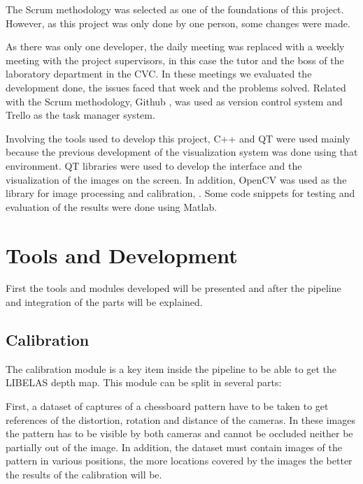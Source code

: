 \documentclass[10pt,a4paper,twocolumn,twoside]{article}
\begin{document}
	The Scrum methodology was selected as one of the foundations of this project. However, as this project was only done by one person, some changes were made. 
	
	As there was only one developer, the daily meeting was replaced with a weekly meeting with the project supervisors, in this case the tutor and the boss of the laboratory department in the CVC. In these meetings we evaluated the development done, the issues faced that week and the problems solved. Related with the Scrum methodology, Github \cite{web:github},\cite{web:githubDesktop} was used as version control system and Trello\cite{web:trello} as the task manager system.
	
	Involving the tools used to develop this project, C++ and QT \cite{web:qt} were used mainly because the previous development of the visualization system was done using that environment. QT libraries were used to develop the interface and the visualization of the images on the screen. In addition, OpenCV was used as the library for image processing and calibration, \cite{web:opencv}. Some code snippets for testing and evaluation of the results were done using Matlab\cite{web:matlab}. 
	
	
	\section{Tools and Development}
	
	First the tools and modules developed will be presented and after the pipeline and integration of the parts will be explained. 
	
	\subsection{Calibration}
	\label{sec:calib}
	
	The calibration module is a key item inside the pipeline to be able to get the LIBELAS depth map. This module can be split in several parts:  
	
	First, a dataset of captures of a chessboard pattern have to be taken to get references of the distortion, rotation and distance of the cameras. In these images the pattern has to be visible by both cameras and cannot be occluded neither be partially out of the image. In addition, the dataset must contain images of the pattern in various positions, the more locations covered by the images the better the results of the calibration will be. 
	
\end{document}
